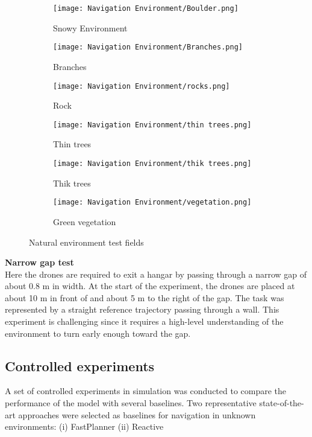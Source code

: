 \begin{figure}[!h]
	\centering
	\begin{subfigure}[b]{0.29\textwidth}
		\centering
		\texttt{[image: Navigation Environment/Boulder.png]}
		\caption{Snowy Environment}
	\end{subfigure}
	\hfill
	\begin{subfigure}[b]{0.29\textwidth}
		\centering
		\texttt{[image: Navigation Environment/Branches.png]}
		\caption{Branches}
	\end{subfigure}
	\hfill	
	\begin{subfigure}[b]{0.29\textwidth}
		\centering
		\texttt{[image: Navigation Environment/rocks.png]}
		\caption{Rock}
	\end{subfigure}
	\hfill
	\begin{subfigure}[b]{0.29\textwidth}
		\centering
		\texttt{[image: Navigation Environment/thin trees.png]}
		\caption{Thin trees}
	\end{subfigure}
	\hfill
	\begin{subfigure}[b]{0.29\textwidth}
		\centering
		\texttt{[image: Navigation Environment/thik trees.png]}
		\caption{Thik trees}
	\end{subfigure}
	\hfill
	\begin{subfigure}[b]{0.29\textwidth}
		\centering
		\texttt{[image: Navigation Environment/vegetation.png]}
		\caption{Green vegetation}
	\end{subfigure}
	
	\caption{Natural environment test fields}
	\label{fig:natural envt}
\end{figure}

\textbf{Narrow gap test}\\
Here the drones are required to exit a hangar by passing through a narrow gap of about 0.8 m in width. At the start of the experiment, the drones are placed at about 10 m in front of and about 5 m
to the right of the gap. The task was represented by a straight reference
trajectory passing through a wall. This experiment is challenging since it requires a high-level understanding of the
environment to turn early enough toward the gap. 

\subsection{Controlled experiments}
A set of controlled experiments in simulation was conducted to compare
the performance of the model with several baselines. Two representative state-of-the-art approaches were selected as baselines for navigation in
unknown environments: (i) FastPlanner \cite{fastPlanner} (ii) Reactive \cite{reactive_method}

